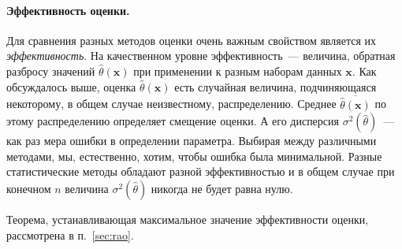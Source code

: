 

\paragraph{Эффективность оценки.}
Для сравнения разных методов оценки очень важным свойством является
их \emph{эффективность}. На качественном уровне эффективность~--- величина,
обратная разбросу значений $\hat{\theta}(\mathbf{x})$ при применении к разным
наборам данных $\mathbf{x}$. Как обсуждалось выше, оценка $\hat{\theta}(\mathbf{x})$
есть случайная величина, подчиняющаяся некоторому, в общем случае неизвестному,
распределению. Среднее $\overline{\hat{\theta}(\mathbf{x})}$ по этому распределению
определяет смещение оценки.
А его дисперсия $\sigma^2\left(\hat\theta\right)$~--- как раз мера ошибки
в определении параметра. Выбирая между различными методами, мы, естественно,
хотим, чтобы ошибка была минимальной. Разные статистические методы обладают
разной эффективностью и в общем случае при конечном $n$ величина
$\sigma^2\left(\hat\theta\right)$ никогда не будет равна нулю.

Теорема, устанавливающая максимальное значение эффективности оценки,
рассмотрена в п.~\ref{sec:rao}.



